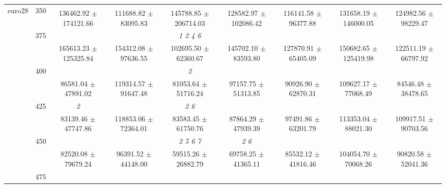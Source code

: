 \begin{table}[h]
{\begin{tabular}{
        ccccccccc}
 \multirow{4}{*}{euro28} & \multirow{2}{*}{350}& & & & & & &  \\ 
 & & 136462.92 $\pm$ 174121.66& 111688.82 $\pm$ 83095.83& 145788.85 $\pm$ 206714.03& 128582.97 $\pm$ 102086.42& 116141.58 $\pm$ 96377.88& 131658.19 $\pm$ 146000.05& 124982.56 $\pm$ 98229.47 \\ 
 & \multirow{2}{*}{375}& \cellcolor[HTML]{EFEFEF} & \cellcolor[HTML]{EFEFEF} & \cellcolor[HTML]{EFEFEF} \textit{ 1 2 4 6 }& \cellcolor[HTML]{EFEFEF} & \cellcolor[HTML]{EFEFEF} & \cellcolor[HTML]{EFEFEF} & \cellcolor[HTML]{EFEFEF}  \\ 
 & & \cellcolor[HTML]{EFEFEF} 165613.23 $\pm$ 125325.84& \cellcolor[HTML]{EFEFEF} 154312.08 $\pm$ 97636.55& \cellcolor[HTML]{EFEFEF} 102695.50 $\pm$ 62360.67& \cellcolor[HTML]{EFEFEF} 145702.10 $\pm$ 83593.80& \cellcolor[HTML]{EFEFEF} 127870.91 $\pm$ 65405.09& \cellcolor[HTML]{EFEFEF} 150682.65 $\pm$ 125419.98& \cellcolor[HTML]{EFEFEF} 122511.19 $\pm$ 66797.92 \\ 
 & \multirow{2}{*}{400}& & & \textit{ 2 }& & & &  \\ 
 & & 86581.04 $\pm$ 47891.02& 119314.57 $\pm$ 91647.48& 81053.64 $\pm$ 51716.24& 97157.75 $\pm$ 51313.85& 90926.90 $\pm$ 62870.31& 109627.17 $\pm$ 77068.49& 84546.48 $\pm$ 38478.65 \\ 
 & \multirow{2}{*}{425}& \cellcolor[HTML]{EFEFEF} \textit{ 2 }& \cellcolor[HTML]{EFEFEF} & \cellcolor[HTML]{EFEFEF} \textit{ 2 6 }& \cellcolor[HTML]{EFEFEF} & \cellcolor[HTML]{EFEFEF} & \cellcolor[HTML]{EFEFEF} & \cellcolor[HTML]{EFEFEF}  \\ 
 & & \cellcolor[HTML]{EFEFEF} 83139.46 $\pm$ 47747.86& \cellcolor[HTML]{EFEFEF} 118853.06 $\pm$ 72364.01& \cellcolor[HTML]{EFEFEF} 83583.45 $\pm$ 61750.76& \cellcolor[HTML]{EFEFEF} 87864.29 $\pm$ 47939.39& \cellcolor[HTML]{EFEFEF} 97491.86 $\pm$ 63201.79& \cellcolor[HTML]{EFEFEF} 113353.04 $\pm$ 88021.30& \cellcolor[HTML]{EFEFEF} 109917.51 $\pm$ 90703.56 \\ 
 & \multirow{2}{*}{450}& & & \textit{ 2 5 6 7 }& \textit{ 2 6 }& & &  \\ 
 & & 82520.08 $\pm$ 79679.24& 96391.52 $\pm$ 44148.00& 59515.26 $\pm$ 26882.79& 69758.25 $\pm$ 41365.11& 85532.12 $\pm$ 41816.46& 104054.70 $\pm$ 70068.26& 90820.58 $\pm$ 52041.36 \\ 
 & \multirow{2}{*}{475}& \cellcolor[HTML]{EFEFEF} & \cellcolor[HTML]{EFEFEF} & \cellcolor[HTML]{EFEFEF} & \cellcolor[HTML]{EFEFEF} & \cellcolor[HTML]{EFEFEF} & \cellcolor[HTML]{EFEFEF} & \cellcolor[HTML]{EFEFEF}  \\ 

\end{tabular}}
\end{table}
